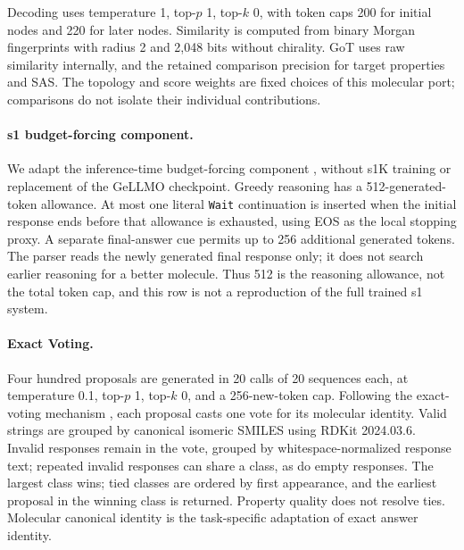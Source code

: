 Decoding uses temperature 1, top-$p$ 1, top-$k$ 0, with token caps 200 for initial nodes and 220 for later nodes. Similarity is computed from binary Morgan fingerprints with radius 2 and 2,048 bits without chirality. GoT uses raw similarity internally, and the retained comparison precision for target properties and SAS. The topology and score weights are fixed choices of this molecular port; comparisons do not isolate their individual contributions.

\paragraph{s1 budget-forcing component.}
We adapt the inference-time budget-forcing component \citep{s1_2025}, without s1K training or replacement of the GeLLMO checkpoint. Greedy reasoning has a 512-generated-token allowance. At most one literal \texttt{Wait} continuation is inserted when the initial response ends before that allowance is exhausted, using EOS as the local stopping proxy. A separate final-answer cue permits up to 256 additional generated tokens. The parser reads the newly generated final response only; it does not search earlier reasoning for a better molecule. Thus 512 is the reasoning allowance, not the total token cap, and this row is not a reproduction of the full trained s1 system.

\paragraph{Exact Voting.}
Four hundred proposals are generated in 20 calls of 20 sequences each, at temperature 0.1, top-$p$ 1, top-$k$ 0, and a 256-new-token cap. Following the exact-voting mechanism \citep{voting2024}, each proposal casts one vote for its molecular identity. Valid strings are grouped by canonical isomeric SMILES using RDKit 2024.03.6. Invalid responses remain in the vote, grouped by whitespace-normalized response text; repeated invalid responses can share a class, as do empty responses. The largest class wins; tied classes are ordered by first appearance, and the earliest proposal in the winning class is returned. Property quality does not resolve ties. Molecular canonical identity is the task-specific adaptation of exact answer identity.

